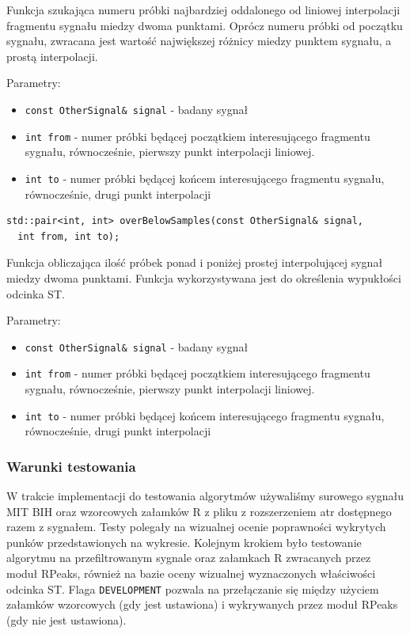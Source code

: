 \documentclass[a4paper, 11pt]{article}
\begin{document}
Funkcja szukająca numeru próbki najbardziej oddalonego od liniowej interpolacji
fragmentu sygnału miedzy dwoma punktami. Oprócz numeru próbki od początku
sygnału, zwracana jest wartość największej różnicy miedzy punktem sygnału, a
prostą interpolacji.

Parametry:
\begin{itemize}
  \item \verb|const OtherSignal& signal| - badany sygnał
  \item \verb|int from| - numer próbki będącej początkiem interesującego
    fragmentu sygnału, równocześnie, pierwszy punkt interpolacji liniowej.
  \item \verb|int to| - numer próbki będącej końcem interesującego fragmentu
    sygnału, równocześnie, drugi punkt interpolacji
\end{itemize}

\begin{lstlisting}
std::pair<int, int> overBelowSamples(const OtherSignal& signal,
  int from, int to);
\end{lstlisting}

Funkcja obliczająca ilość próbek ponad i poniżej prostej interpolującej sygnał
miedzy dwoma punktami. Funkcja wykorzystywana jest do określenia wypukłości
odcinka ST.

Parametry:
\begin{itemize}
  \item \verb|const OtherSignal& signal| - badany sygnał
  \item \verb|int from| - numer próbki będącej początkiem interesującego
    fragmentu sygnału, równocześnie, pierwszy punkt interpolacji liniowej.
  \item \verb|int to| - numer próbki będącej końcem interesującego fragmentu
    sygnału, równocześnie, drugi punkt interpolacji
\end{itemize}

\subsubsection{Warunki testowania}
\label{sec:st_interval:tests}
W trakcie implementacji do testowania algorytmów używaliśmy surowego sygnału MIT BIH oraz wzorcowych załamków R z pliku z rozszerzeniem atr dostępnego razem z sygnałem. Testy polegały na wizualnej ocenie poprawności wykrytych punków przedstawionych na wykresie. Kolejnym krokiem było testowanie algorytmu na przefiltrowanym sygnale oraz załamkach R zwracanych przez moduł RPeaks, również na bazie oceny wizualnej wyznaczonych właściwości odcinka ST. Flaga \verb|DEVELOPMENT| pozwala na przełączanie się między użyciem załamków wzorcowych (gdy jest ustawiona) i wykrywanych przez moduł RPeaks (gdy nie jest ustawiona).
\end{document}
